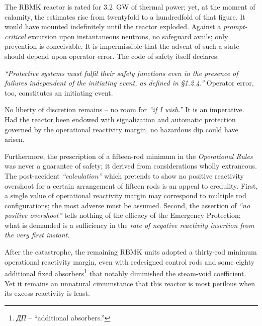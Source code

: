 \documentclass[openright]{bookest}
\begin{document}
The RBMK reactor is rated for \qty{3.2}{\giga\watt} of thermal power; yet, at the moment of calamity, the estimates rise from twentyfold to a hundredfold of that figure. It would have mounted indefinitely until the reactor exploded. Against a \textit{prompt-critical} excursion upon instantaneous neutrons, no safeguard avails; only prevention is conceivable. It is impermissible that the advent of such a state should depend upon operator error. The code of safety itself declares:

\begin{personal}
\textit{``Protective systems must fulfil their safety functions even in the presence of failures independent of the initiating event, as defined in §1.2.4.''} Operator error, too, constitutes an initiating event.
\end{personal}

No liberty of discretion remains -- no room for \textit{``if I wish.''} It is an imperative. Had the reactor been endowed with signalization and automatic protection governed by the operational reactivity margin, no hazardous dip could have arisen.

Furthermore, the prescription of a fifteen-rod minimum in the \textit{Operational Rules} was never a guarantee of safety; it derived from considerations wholly extraneous. The post-accident \textit{``calculation''} which pretends to show no positive reactivity overshoot for a certain arrangement of fifteen rods is an appeal to credulity. First, a single value of operational reactivity margin may correspond to multiple rod configurations; the most adverse must be assumed. Second, the assertion of \textit{``no positive overshoot''} tells nothing of the efficacy of the Emergency Protection; what is demanded is a sufficiency in the \textit{rate of negative reactivity insertion from the very first instant.}

After the catastrophe, the remaining RBMK units adopted a thirty-rod minimum operational reactivity margin, even with redesigned control rods and some eighty additional fixed absorbers\footnote{\textit{ДП} -- ``additional absorbers.''} that notably diminished the steam-void coefficient. Yet it remains an unnatural circumstance that this reactor is most perilous when its excess reactivity is least.
\end{document}
